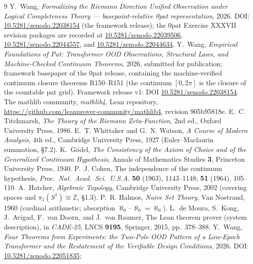 \documentclass{article}
\begin{document}
\begin{thebibliography}{9}
Y.~Wang, \emph{Formalizing the Riemann Direction Unified Observation
under Logical Completeness Theory --- basepoint-relative 0pat
representation}, 2026. DOI:
\href{https://doi.org/10.5281/zenodo.22038154}{10.5281/zenodo.22038154}
(the framework release); the 0pat Exercise XXXVII revision packages are
recorded at \href{https://doi.org/10.5281/zenodo.22039506}{10.5281/zenodo.22039506},
\href{https://doi.org/10.5281/zenodo.22044557}{10.5281/zenodo.22044557}, and
\href{https://doi.org/10.5281/zenodo.22044634}{10.5281/zenodo.22044634}.
Y.~Wang, \emph{Empirical Foundations of Pat: Transformer OOD Observations,
Structural Laws, and Machine-Checked Continuum Theorems}, 2026, submitted
for publication; framework basepaper of the 0pat release, containing the
machine-verified continuum closure theorems R150--R151 (the continuum
$[0,2\pi]$ is the closure of the countable pat grid). Framework release
v1: DOI
\href{https://doi.org/10.5281/zenodo.22038154}{10.5281/zenodo.22038154}.
The mathlib community, \emph{mathlib4}, Lean repository,
\url{https://github.com/leanprover-community/mathlib4}, revision 905b95818e.
E.~C. Titchmarsh, \emph{The Theory of the Riemann Zeta-Function}, 2nd ed.,
Oxford University Press, 1986.
E.~T. Whittaker and G.~N. Watson, \emph{A Course of Modern Analysis}, 4th ed.,
Cambridge University Press, 1927 (Euler--Maclaurin summation, \S7.2).
K.~G\"odel, \emph{The Consistency of the Axiom of Choice and of the
Generalized Continuum Hypothesis}, Annals of Mathematics Studies \textbf{3},
Princeton University Press, 1940.
P.~J. Cohen, The independence of the continuum hypothesis,
\emph{Proc.\ Nat.\ Acad.\ Sci.\ U.S.A.} \textbf{50} (1963), 1143--1148;
\textbf{51} (1964), 105--110.
A.~Hatcher, \emph{Algebraic Topology}, Cambridge University Press, 2002
(covering spaces and $\pi_1(S^1)\cong\mathbb Z$, \S1.3).
P.~R. Halmos, \emph{Naive Set Theory}, Van Nostrand, 1960
(cardinal arithmetic; absorption $\aleph_0\cdot\aleph_0=\aleph_0$).
L.~de Moura, S.~Kong, J.~Avigad, F.~van Doorn, and J.~von Raumer,
The Lean theorem prover (system description), in \emph{CADE-25},
LNCS \textbf{9195}, Springer, 2015, pp.~378--388.
Y.~Wang, \emph{Four Theorems from Experiments: the Two-Pole OOD
Pattern of a Low-Epoch Transformer and the Restatement of the
Verifiable Design Conditions}, 2026. DOI:
\href{https://doi.org/10.5281/zenodo.22051835}{10.5281/zenodo.22051835};

\end{thebibliography}
\end{document}
